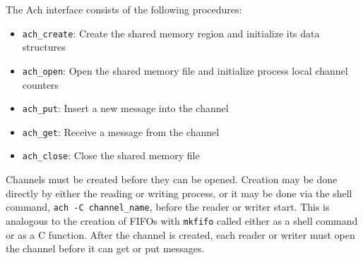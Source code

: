 \documentclass[letterpaper]{IEEEtran}
\begin{document}
The Ach interface consists of the following procedures:

\begin{itemize}
  \item {\tt ach\_create}: Create the shared memory region and
    initialize its data structures
  \item {\tt ach\_open}: Open the shared memory file and initialize
    process local channel counters
  \item {\tt ach\_put}: Insert a new message into the channel
  \item {\tt ach\_get}: Receive a message from the channel
  \item {\tt ach\_close}: Close the shared memory file
\end{itemize}

\noindent Channels must be created before they can be opened. Creation
may be done directly by either the reading or writing process, or it
may be done via the shell command, {\tt ach -C channel\_name}, before
the reader or writer start.  This is analogous to the creation of
FIFOs with {\tt mkfifo} called either as a shell command or as a C
function.  After the channel is created, each reader or writer must
open the channel before it can get or put messages.

\end{document}
